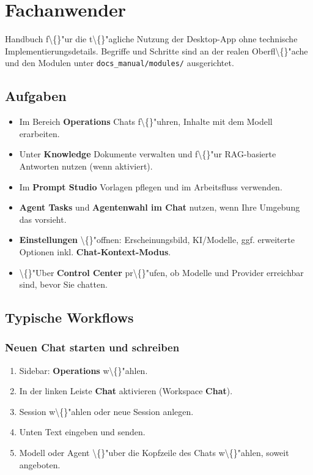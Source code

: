 \section{Fachanwender}

Handbuch f\textbackslash\{\}"ur die t\textbackslash\{\}"agliche Nutzung der Desktop-App ohne technische Implementierungsdetails. Begriffe und Schritte sind an der realen Oberfl\textbackslash\{\}"ache und den Modulen unter \texttt{docs\_manual/modules/} ausgerichtet.

\subsection{Aufgaben}

\begin{itemize}
\item Im Bereich \textbf{Operations} Chats f\textbackslash\{\}"uhren, Inhalte mit dem Modell erarbeiten.
\item Unter \textbf{Knowledge} Dokumente verwalten und f\textbackslash\{\}"ur RAG-basierte Antworten nutzen (wenn aktiviert).
\item Im \textbf{Prompt Studio} Vorlagen pflegen und im Arbeitsfluss verwenden.
\item \textbf{Agent Tasks} und \textbf{Agentenwahl im Chat} nutzen, wenn Ihre Umgebung das vorsieht.
\item \textbf{Einstellungen} \textbackslash\{\}"offnen: Erscheinungsbild, KI/Modelle, ggf. erweiterte Optionen inkl. \textbf{Chat-Kontext-Modus}.
\item \textbackslash\{\}"Uber \textbf{Control Center} pr\textbackslash\{\}"ufen, ob Modelle und Provider erreichbar sind, bevor Sie chatten.
\end{itemize}

\subsection{Typische Workflows}

\subsubsection{Neuen Chat starten und schreiben}

\begin{enumerate}
\item Sidebar: \textbf{Operations} w\textbackslash\{\}"ahlen.
\item In der linken Leiste \textbf{Chat} aktivieren (Workspace \textbf{Chat}).
\item Session w\textbackslash\{\}"ahlen oder neue Session anlegen.
\item Unten Text eingeben und senden.
\item Modell oder Agent \textbackslash\{\}"uber die Kopfzeile des Chats w\textbackslash\{\}"ahlen, soweit angeboten.
\end{enumerate}

